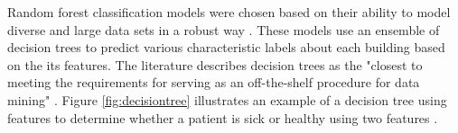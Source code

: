 Random forest classification models were chosen based on their ability to model diverse and large data sets in a robust way \cite{Breiman}. These models use an ensemble of decision trees to predict various characteristic labels about each building based on the its features. The literature describes decision trees as the "closest to meeting the requirements for serving as an off-the-shelf procedure for data mining" \cite{hastie_elements_2009}. Figure \ref{fig:decisiontree} illustrates an example of a decision tree using features to determine whether a patient is sick or healthy using two features \cite{Geurts_2009}. 
